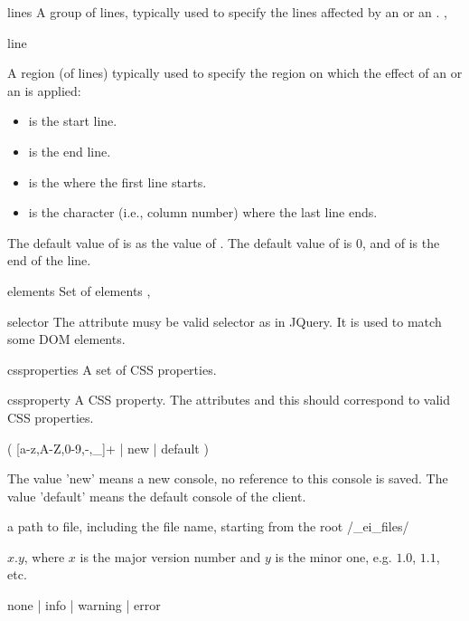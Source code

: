 \bigskip
\xmlstruct
{lines}
{
A group of lines, typically used to specify the lines affected by 
an  or an .
}
{, }

\bigskip
\xmlstruct
{line}
{
%
  A region (of lines) typically used to specify the region on which
  the effect of an  or an
   is applied:
%
\begin{itemize}
\item {} is the start line.
\item {} is the end line.
\item {} is the  where the first line starts.
\item {} is the character (i.e., column number) where the last line ends.
\end{itemize}
%
The default value of  is as the value of
. The default value of  is
0, and of  is the end of the line.
%
} 
{}

\bigskip
\xmlstruct
{elements}
{
Set of elements
} 
{, }

\bigskip
\xmlstruct
{selector}
{
%
  The attribute  musy be valid selector as in
  JQuery. It is used to match some DOM elements.
%
}
{}

\bigskip
\xmlstruct
{cssproperties}
{
%
A set of CSS properties.
%
}
{}

\bigskip
\xmlstruct
{cssproperty}
{
%
  A CSS property. The attributes  and this
   should correspond to valid CSS properties.
%
}
{}


\noindent
{}

( [a-z,A-Z,0-9,-,\_]+ | new | default )

The value 'new' means a new console, no reference to this console is
saved. The value 'default' means the default console of the client.

\noindent
{}

a path to file, including the file name, starting from the root /\_ei\_files/

\noindent
{}

$x.y$, where $x$ is the major version number and $y$ is the minor one,
e.g. $1.0$, $1.1$, etc.

\noindent
{}

none | info | warning | error 


